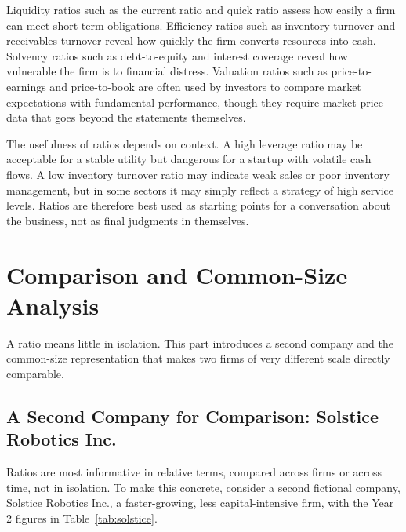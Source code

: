 \documentclass[../ai_in_finance]{subfiles}
\begin{document}
Liquidity ratios such as the current ratio and quick ratio assess how easily a firm can meet short-term obligations. Efficiency ratios such as inventory turnover and receivables turnover reveal how quickly the firm converts resources into cash. Solvency ratios such as debt-to-equity and interest coverage reveal how vulnerable the firm is to financial distress. Valuation ratios such as price-to-earnings and price-to-book are often used by investors to compare market expectations with fundamental performance, though they require market price data that goes beyond the statements themselves.

The usefulness of ratios depends on context. A high leverage ratio may be acceptable for a stable utility but dangerous for a startup with volatile cash flows. A low inventory turnover ratio may indicate weak sales or poor inventory management, but in some sectors it may simply reflect a strategy of high service levels. Ratios are therefore best used as starting points for a conversation about the business, not as final judgments in themselves.

\section{Comparison and Common-Size Analysis}

A ratio means little in isolation. This part introduces a second company and the common-size representation that makes two firms of very different scale directly comparable.

\subsection{A Second Company for Comparison: Solstice Robotics Inc.}
\label{sec:solstice}

Ratios are most informative in relative terms, compared across firms or across time, not in isolation. To make this concrete, consider a second fictional company, Solstice Robotics Inc., a faster-growing, less capital-intensive firm, with the Year 2 figures in Table~\ref{tab:solstice}.
\end{document}
